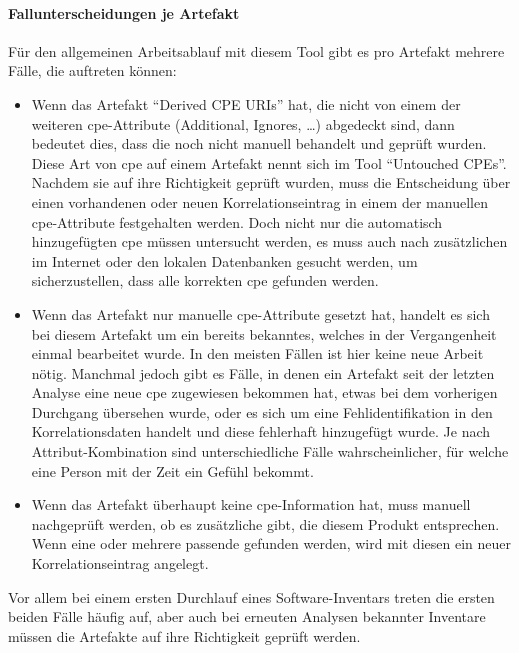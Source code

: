 
\paragraph{Fallunterscheidungen je Artefakt}
Für den allgemeinen Arbeitsablauf mit diesem Tool gibt es pro Artefakt mehrere Fälle, die auftreten können:

\begin{itemize}
    \item Wenn das Artefakt \enquote{Derived CPE URIs} hat, die nicht von einem der weiteren \acrshort{cpe}-Attribute (Additional, Ignores, \ldots) abgedeckt sind, dann bedeutet dies, dass die  noch nicht manuell behandelt und geprüft wurden.
    Diese Art von \acrshort{cpe} auf einem Artefakt nennt sich im Tool \enquote{Untouched CPEs}.
    Nachdem sie auf ihre Richtigkeit geprüft wurden, muss die Entscheidung über einen vorhandenen oder neuen Korrelationseintrag in einem der manuellen \acrshort{cpe}-Attribute festgehalten werden.
    Doch nicht nur die automatisch hinzugefügten \acrshort{cpe} müssen untersucht werden, es muss auch nach zusätzlichen  im Internet oder den lokalen Datenbanken gesucht werden, um sicherzustellen, dass alle korrekten \acrshort{cpe} gefunden werden.

    \item Wenn das Artefakt nur manuelle \acrshort{cpe}-Attribute gesetzt hat, handelt es sich bei diesem Artefakt um ein bereits bekanntes, welches in der Vergangenheit einmal bearbeitet wurde.
    In den meisten Fällen ist hier keine neue Arbeit nötig.
    Manchmal jedoch gibt es Fälle, in denen ein Artefakt seit der letzten Analyse eine neue \acrshort{cpe} zugewiesen bekommen hat, etwas bei dem vorherigen Durchgang übersehen wurde, oder es sich um eine Fehlidentifikation in den Korrelationsdaten handelt und diese fehlerhaft hinzugefügt wurde.
    Je nach Attribut-Kombination sind unterschiedliche Fälle wahrscheinlicher, für welche eine Person mit der Zeit ein Gefühl bekommt.

    \item Wenn das Artefakt überhaupt keine \acrshort{cpe}-Information hat, muss manuell nachgeprüft werden, ob es zusätzliche gibt, die diesem Produkt entsprechen.
    Wenn eine oder mehrere passende gefunden werden, wird mit diesen ein neuer Korrelationseintrag angelegt.
\end{itemize}

Vor allem bei einem ersten Durchlauf eines Software-Inventars treten die ersten beiden Fälle häufig auf, aber auch bei erneuten Analysen bekannter Inventare müssen die Artefakte auf ihre Richtigkeit geprüft werden.
